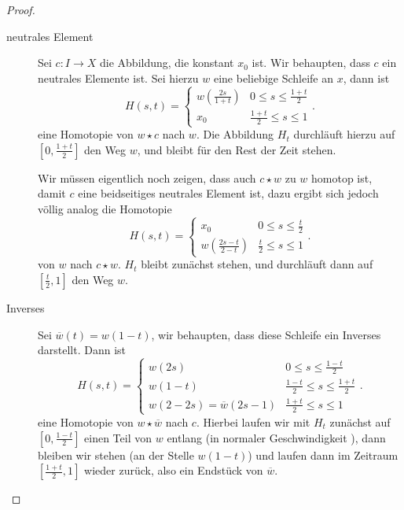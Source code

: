 \begin{proof}
\begin{description}
\item[neutrales Element] Sei $c\colon  I \to X$ die Abbildung, die konstant $x_0$ ist. Wir behaupten, dass $c$ ein neutrales Elemente ist. Sei hierzu  $w$ eine beliebige Schleife an  $x$, dann ist
    \[
        H(s,t) = \begin{cases}
            w(\frac{2s}{1+t}) & 0 \leq  s\leq \frac{1+t}{2} \\
           x_0 & \frac{1+t}{2}\leq s\leq 1
        \end{cases}
    .\] 
    eine Homotopie von $w \star c$ nach  $w$. Die Abbildung $H_t$ durchläuft hierzu auf  $[0,\frac{1+t}{2}]$ den Weg $w$, und bleibt für den Rest der Zeit stehen.
    \begin{remark*}
        Wir müssen eigentlich noch zeigen, dass auch $c\star w$ zu  $w$ homotop ist, damit  $c$ eine beidseitiges neutrales Element ist, dazu ergibt sich jedoch völlig analog die Homotopie
         \[
             H(s,t) = \begin{cases}
                 x_0 & 0\leq s \leq  \frac{t}{2} \\
                 w\left( \frac{2s-t}{2-t} \right) & \frac{t}{2} \leq s \leq  1
             \end{cases}
        .\] 
        von $w$ nach  $c \star w$.  $H_t$ bleibt zunächst stehen, und durchläuft dann auf  $[\frac{t}{2},1]$ den Weg $w$.
    \end{remark*}

\item[Inverses] Sei $\overline{w} (t) = w(1-t)$, wir behaupten, dass diese Schleife ein Inverses darstellt. Dann ist
    \[
        H(s,t) = \begin{cases}
            w(2s) & 0 \leq  s \leq  \frac{1-t}{2} \\
            w(1-t) & \frac{1-t}{2} \leq  s \leq  \frac{1+t}{2} \\
            w(2-2s) = \overline{w}(2s-1) & \frac{1+t}{2} \leq  s \leq  1
        \end{cases}
    .\] 
    eine Homotopie von $w \star \overline{w}$ nach $c$. Hierbei laufen wir mit $H_t$ zunächst auf $[0, \frac{1-t}{2}]$ einen Teil von $w$ entlang (in normaler Geschwindigkeit ), dann bleiben wir stehen (an der Stelle $w(1-t)$) und laufen dann im Zeitraum  $[\frac{1+t}{2},1]$ wieder zurück, also ein Endstück von $\overline{w}$.


\end{description}
\end{proof}
